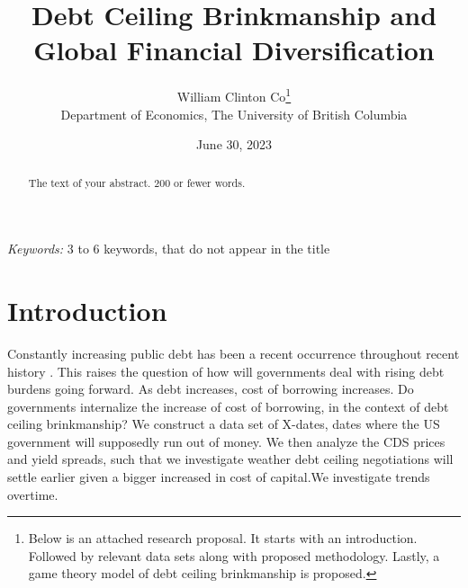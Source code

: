 \documentclass[
  12pt]{article}
\begin{document}
\def\spacingset#1{\renewcommand{\baselinestretch}%
{#1}\small\normalsize} \spacingset{1}



\date{June 30, 2023}
\title{\bf Debt Ceiling Brinkmanship and Global Financial
Diversification}
\author{
William Clinton Co\thanks{Below is an attached research proposal. It
starts with an introduction. Followed by relevant data sets along with
proposed methodology. Lastly, a game theory model of debt ceiling
brinkmanship is proposed.}\\
Department of Economics, The University of British Columbia\\
}
\maketitle

\bigskip
\bigskip
\begin{abstract}
The text of your abstract. 200 or fewer words.
\end{abstract}

\noindent%
{\it Keywords:} 3 to 6 keywords, that do not appear in the title
\vfill

\newpage
\spacingset{1.9} %
\ifdefined\Shaded\renewenvironment{Shaded}{\begin{tcolorbox}[interior hidden, frame hidden, boxrule=0pt, borderline west={3pt}{0pt}{shadecolor}, breakable, enhanced, sharp corners]}{\end{tcolorbox}}\fi

\hypertarget{sec-intro}{%
\section{Introduction}\label{sec-intro}}

Constantly increasing public debt has been a recent occurrence
throughout recent history \citet{mitchener2023}. This raises the
question of how will governments deal with rising debt burdens going
forward. As debt increases, cost of borrowing increases. Do governments
internalize the increase of cost of borrowing, in the context of debt
ceiling brinkmanship? We construct a data set of X-dates, dates where
the US government will supposedly run out of money. We then analyze the
CDS prices and yield spreads, such that we investigate weather debt
ceiling negotiations will settle earlier given a bigger increased in
cost of capital.We investigate trends overtime.
\end{document}
